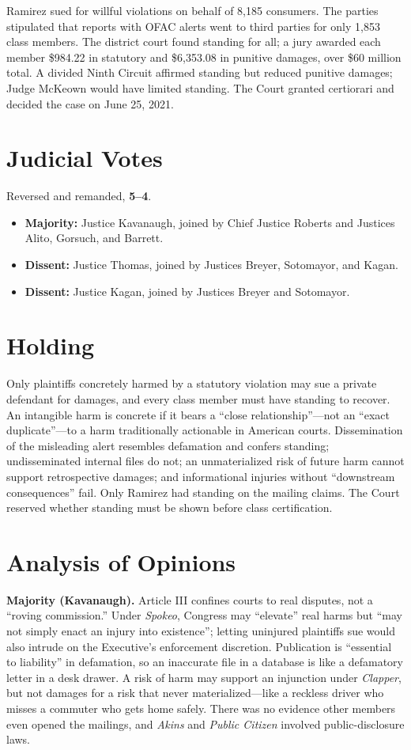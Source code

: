 \documentclass[12pt]{article}
\begin{document}
Ramirez sued for willful violations on behalf of 8,185 consumers. The parties stipulated that reports with OFAC alerts went to third parties for only 1,853 class members. The district court found standing for all; a jury awarded each member \$984.22 in statutory and \$6,353.08 in punitive damages, over \$60 million total. A divided Ninth Circuit affirmed standing but reduced punitive damages; Judge McKeown would have limited standing. The Court granted certiorari and decided the case on June 25, 2021.

\section{Judicial Votes}

Reversed and remanded, \textbf{5--4}.
\begin{itemize}
\item \textbf{Majority:} Justice Kavanaugh, joined by Chief Justice Roberts and Justices Alito, Gorsuch, and Barrett.
\item \textbf{Dissent:} Justice Thomas, joined by Justices Breyer, Sotomayor, and Kagan.
\item \textbf{Dissent:} Justice Kagan, joined by Justices Breyer and Sotomayor.
\end{itemize}

\section{Holding}

Only plaintiffs concretely harmed by a statutory violation may sue a private defendant for damages, and every class member must have standing to recover. An intangible harm is concrete if it bears a ``close relationship''---not an ``exact duplicate''---to a harm traditionally actionable in American courts. Dissemination of the misleading alert resembles defamation and confers standing; undisseminated internal files do not; an unmaterialized risk of future harm cannot support retrospective damages; and informational injuries without ``downstream consequences'' fail. Only Ramirez had standing on the mailing claims. The Court reserved whether standing must be shown before class certification.

\section{Analysis of Opinions}

\textbf{Majority (Kavanaugh).} Article III confines courts to real disputes, not a ``roving commission.'' Under \textit{Spokeo}, Congress may ``elevate'' real harms but ``may not simply enact an injury into existence''; letting uninjured plaintiffs sue would also intrude on the Executive's enforcement discretion. Publication is ``essential to liability'' in defamation, so an inaccurate file in a database is like a defamatory letter in a desk drawer. A risk of harm may support an injunction under \textit{Clapper}, but not damages for a risk that never materialized---like a reckless driver who misses a commuter who gets home safely. There was no evidence other members even opened the mailings, and \textit{Akins} and \textit{Public Citizen} involved public-disclosure laws.
\end{document}

